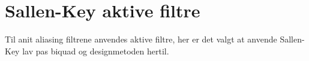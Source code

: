 \section{Sallen-Key aktive filtre}

Til anit aliasing filtrene anvendes aktive filtre, her er det valgt at anvende Sallen-Key lav pas biquad og designmetoden hertil.
